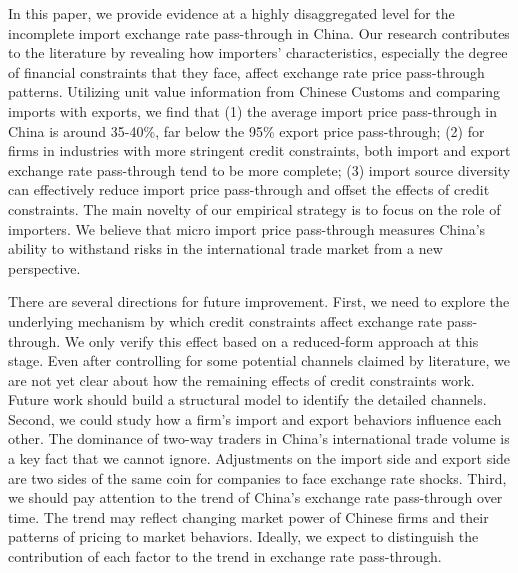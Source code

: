\documentclass[12pt]{article}
\begin{document}
In this paper, we provide evidence at a highly disaggregated level for the incomplete import exchange rate pass-through in China. Our research contributes to the literature by revealing how importers' characteristics, especially the degree of financial constraints that they face, affect exchange rate price pass-through patterns. Utilizing unit value information from Chinese Customs and comparing imports with exports, we find that (1) the average import price pass-through in China is around 35-40\%, far below the 95\% export price pass-through; (2) for firms in industries with more stringent credit constraints, both import and export exchange rate pass-through tend to be more complete; (3) import source diversity can effectively reduce import price pass-through and offset the effects of credit constraints. The main novelty of our empirical strategy is to focus on the role of importers. We believe that micro import price pass-through measures China's ability to withstand risks in the international trade market from a new perspective.

There are several directions for future improvement. First, we need to explore the underlying mechanism by which credit constraints affect exchange rate pass-through. We only verify this effect based on a reduced-form approach at this stage. Even after controlling for some potential channels claimed by literature, we are not yet clear about how the remaining effects of credit constraints work. Future work should build a structural model to identify the detailed channels. Second, we could study how a firm's import and export behaviors influence each other. The dominance of two-way traders in China's international trade volume is a key fact that we cannot ignore. Adjustments on the import side and export side are two sides of the same coin for companies to face exchange rate shocks. Third, we should pay attention to the trend of China's exchange rate pass-through over time. The trend may reflect changing market power of Chinese firms and their patterns of pricing to market behaviors. Ideally, we expect to distinguish the contribution of each factor to the trend in exchange rate pass-through. 

\newpage 


\label{sec-appendix}
\end{document}
